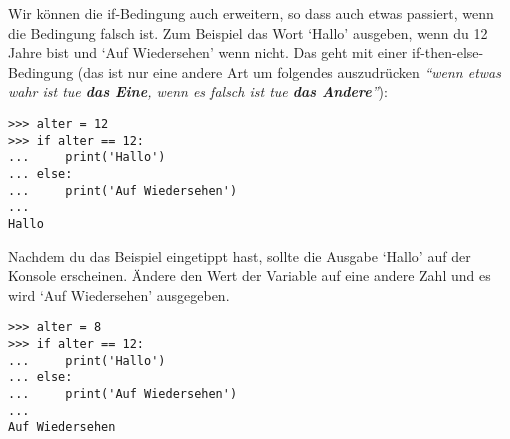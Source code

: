 Wir können die if-Bedingung auch erweitern, so dass auch etwas passiert, wenn die Bedingung falsch ist. Zum Beispiel das Wort `Hallo' ausgeben, wenn du 12 Jahre bist und `Auf Wiedersehen' wenn nicht. Das geht mit einer if-then-else-Bedingung (das ist nur eine andere Art um folgendes auszudrücken \emph{``wenn etwas wahr ist tue \textbf{das Eine}, wenn es falsch ist tue \textbf{das Andere}''}):

\begin{Verbatim}[frame=single]
>>> alter = 12
>>> if alter == 12:
...     print('Hallo')
... else:
...     print('Auf Wiedersehen')
...
Hallo
\end{Verbatim}

Nachdem du das Beispiel eingetippt hast, sollte die Ausgabe `Hallo' auf der Konsole erscheinen. Ändere den Wert der Variable  auf eine andere Zahl und es wird `Auf Wiedersehen' ausgegeben.


\begin{Verbatim}[frame=single]
>>> alter = 8
>>> if alter == 12:
...     print('Hallo')
... else:
...     print('Auf Wiedersehen')
...
Auf Wiedersehen
\end{Verbatim}

